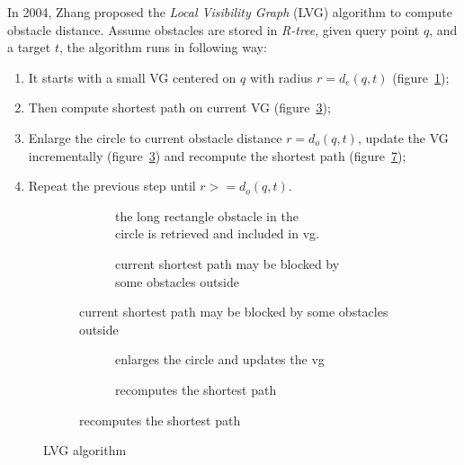 In 2004, Zhang proposed the \textit{Local Visibility Graph} (LVG) algorithm\cite{zhang2004spatial}
to compute obstacle distance.
Assume obstacles are stored in \textit{R-tree},
given query point $q$, and a target $t$, the algorithm runs in
following way:
\begin{enumerate}
    \item It starts with a small VG centered on $q$ with radius $r=d_e(q, t)$ (figure~\ref{edbt1});
    \item Then compute shortest path on current VG (figure~\ref{edbt2});
    \item Enlarge the circle to current obstacle distance $r=d_o(q,t)$, update the VG
      incrementally (figure~\ref{edbt2}) and recompute the shortest path (figure~\ref{edbt4});
    \item Repeat the previous step until $r>=d_o(q, t)$.
\end{enumerate}

\begin{figure}[!h]
  \begin{subfigure}{\linewidth}
    \centering
    \begin{subfigure}{.45\linewidth}
      \centering
      
      \caption{
        \small 
        the long rectangle obstacle in the\\
        circle is retrieved and included in vg.
      }
      \label{edbt1}
    \end{subfigure}%
    \begin{subfigure}{.45\linewidth}
      \centering
      
      \caption{
        \small current shortest path may be blocked by some obstacles outside
      }
      \label{edbt2}
    \end{subfigure}
  \end{subfigure}\par\medskip
  \begin{subfigure}{\linewidth}
    \centering
    \begin{subfigure}{.45\linewidth}
      \centering
      
      \caption{
        \small enlarges the circle and updates the vg
      }
      \label{edbt3}
    \end{subfigure}%
    \begin{subfigure}{.45\linewidth}
      \centering
      
      \caption{
        \small recomputes the shortest path  
      }
      \label{edbt4}
    \end{subfigure}
  \end{subfigure}
  \caption{\small LVG algorithm}
\end{figure}

